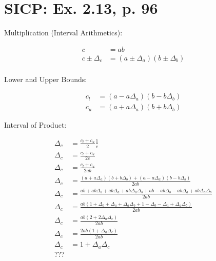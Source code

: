 \documentclass[a4paper]{scrartcl}
\begin{document}
\setlength\parindent{0pt}

\section*{SICP: Ex. 2.13, p. 96}

Multiplication (Interval Arithmetics):

\begin{align}
c &= ab \\
c \pm \Delta_c &= (a \pm \Delta_a) (b \pm \Delta_b) \\
\end{align}

Lower and Upper Bounds:

\begin{align}
c_l &= (a - a \Delta_a) (b - b \Delta_b) \\
c_u &= (a + a \Delta_a) (b + b \Delta_b)
\end{align}

Interval of Product:

\begin{align}
\Delta_c &= \frac{c_l+c_u}{2} \frac{1}{c} \\
\Delta_c &= \frac{c_l+c_u}{2c} \\
\Delta_c &= \frac{c_l+c_u}{2ab} \\
\Delta_c &= \frac{(a+a\Delta_a)(b+b\Delta_b)+(a-a\Delta_a)(b-b\Delta_b)}{2ab} \\
\Delta_c &= \frac{ab+ab\Delta_b+ab\Delta_a+ab\Delta_a\Delta_b+ab-ab\Delta_b-ab\Delta_a+ab\Delta_a\Delta_b}{2ab} \\
\Delta_c &= \frac{ab(1+\Delta_b+\Delta_a+\Delta_a\Delta_b+1-\Delta_b-\Delta_a+\Delta_a\Delta_b)}{2ab} \\
\Delta_c &= \frac{ab(2+2\Delta_a\Delta_c)}{2ab} \\
\Delta_c &= \frac{2ab(1+\Delta_a\Delta_c)}{2ab} \\
\Delta_c &= 1+\Delta_a\Delta_c \\
\text{???}
\end{align}
\end{document}
